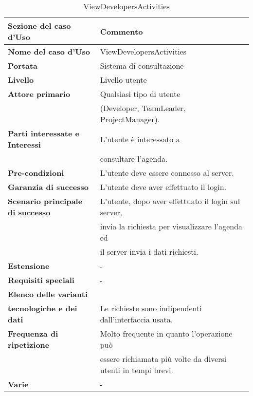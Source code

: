 \documentclass[12pt]{scrartcl}
\begin{document}
\begin{table}[h!]
    \caption{ViewDevelopersActivities}
  \label{tab:table2}
  \begin{tabular}{|l|l|}
    \toprule
    \textbf{Sezione del caso d'Uso} & \textbf{Commento}\\
    \midrule
    \textbf{Nome del caso d'Uso} & ViewDevelopersActivities\\
    \midrule
    \textbf{Portata} & Sistema di consultazione \\
    \midrule
    \textbf{Livello} & Livello utente\\
    \midrule
    \textbf{Attore primario} & Qualsiasi tipo di utente \\& (Developer, TeamLeader, ProjectManager).\\
    \midrule
    \textbf{Parti interessate e Interessi} & L'utente \`e interessato a \\& consultare l'agenda.\\
    \midrule
    \textbf{Pre-condizioni} & L'utente deve essere connesso al server.\\
    \midrule
    \textbf{Garanzia di successo} & L'utente deve aver effettuato il login.\\
    \midrule
    \textbf{Scenario principale di successo} & L'utente, dopo aver effettuato il login sul server,
    \\& invia la richiesta per visualizzare l'agenda ed 
    \\& il server invia i dati richiesti.\\
    \midrule
    \textbf{Estensione} & - \\
    \midrule
    \textbf{Requisiti speciali} & - \\
    \midrule
    \textbf{Elenco delle varianti}\\ \textbf{tecnologiche e dei dati} & Le richieste sono indipendenti dall'interfaccia usata.\\
    \midrule
    \textbf{Frequenza di ripetizione} & Molto frequente in quanto l'operazione pu\`o \\& 
    essere richiamata pi\`u volte da diversi utenti in tempi brevi.\\
    \midrule
    \textbf{Varie} & - \\
    \bottomrule
  \end{tabular}
\end{table}
\end{document}
